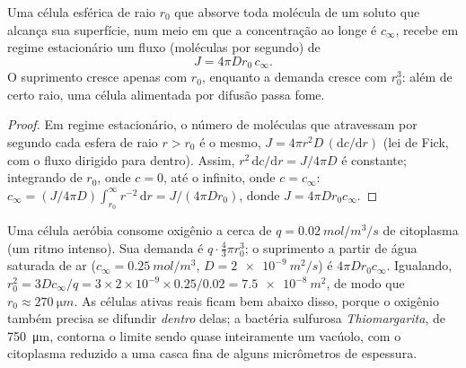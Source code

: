 \begin{theorem}\label{thm:b2:unicellular-diversity:supply}
Uma célula esférica de raio $r_0$ que absorve toda molécula de um
soluto que alcança sua superfície, num meio em que a concentração ao
longe é $c_\infty$, recebe em regime estacionário um fluxo (moléculas
por segundo) de
\[
J = 4\pi D r_0\, c_\infty .
\]
O suprimento cresce apenas com $r_0$, enquanto a demanda cresce com
$r_0^3$: além de certo raio, uma célula alimentada por difusão passa
fome.
\end{theorem}
\begin{proof}
Em regime estacionário, o número de moléculas que atravessam por
segundo cada esfera de raio $r > r_0$ é o mesmo, $J = 4\pi r^2 D\,
(\mathrm{d}c/\mathrm{d}r)$ (lei de Fick, com o fluxo dirigido para
dentro). Assim, $r^2\,\mathrm{d}c/\mathrm{d}r = J/4\pi D$ é constante;
integrando de $r_0$, onde $c = 0$, até o infinito, onde
$c = c_\infty$:
$c_\infty = (J/4\pi D)\int_{r_0}^{\infty} r^{-2}\,\mathrm{d}r =
J/(4\pi D r_0)$, donde $J = 4\pi D r_0 c_\infty$.
\end{proof}

\begin{example}\label{ex:b2:unicellular-diversity:howbig}
Uma célula aeróbia consome oxigênio a cerca de
$q = \qty{0.02}{mol/m^3/s}$ de citoplasma (um ritmo intenso). Sua
demanda é $q \cdot \tfrac{4}{3}\pi
r_0^3$; o suprimento a partir de água saturada de ar ($c_\infty =
\qty{0.25}{mol/m^3}$, $D = \qty{2e-9}{m^2/s}$) é $4\pi D r_0
c_\infty$. Igualando, $r_0^2 = 3Dc_\infty/q = 3\times 2\times 10^{-9}
\times 0.25/0.02 = \qty{7.5e-8}{m^2}$, de modo que $r_0 \approx
\qty{270}{\micro m}$. As células ativas reais ficam bem abaixo disso,
porque o oxigênio também precisa se difundir \emph{dentro} delas; a
bactéria sulfurosa \emph{Thiomargarita}, de \qty{750}{\micro m},
contorna o limite sendo quase inteiramente um vacúolo, com o
citoplasma reduzido a uma casca fina de alguns micrômetros de
espessura.
\end{example}

